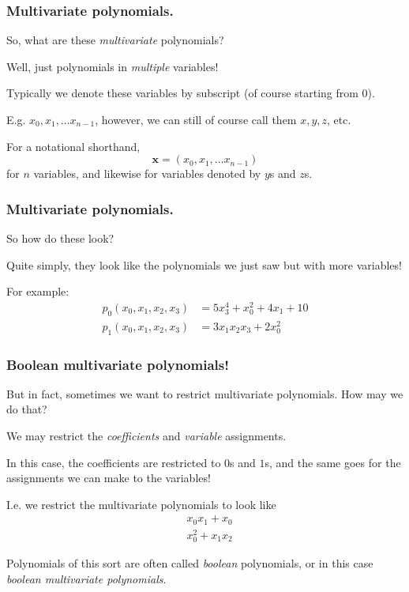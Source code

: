 \documentclass{beamer}
\begin{document}
\begin{frame}
    \frametitle{Multivariate polynomials.}
    So, what are these \textit{multivariate} polynomials?
    
    \pause 

    Well, just polynomials in \textit{multiple} variables!

    \pause 

    Typically we denote these variables by subscript (of course starting from $0$).

    E.g. $x_0, x_1, \dots x_{n - 1}$, however, we can still of course call them $x, y, z$, etc.

    \pause 

    For a notational shorthand, 
    $$
        \mathbf{x} = (x_0, x_1, \dots x_{n - 1})
    $$ 
    for $n$ variables, and likewise for variables denoted by $y$s and $z$s.
\end{frame}

\begin{frame}
    \frametitle{Multivariate polynomials.}
    So how do these look?

    \pause 

    Quite simply, they look like the polynomials we just saw but with more variables!

    \pause 
    For example:
    \begin{equation*}
        \begin{split}
            p_0(x_0, x_1, x_2, x_3) &= 5x_3^4 + x_0^2 + 4x_1 + 10\\
            p_1(x_0, x_1, x_2, x_3) &= 3x_1x_2x_3 + 2x_0^2
        \end{split}
    \end{equation*}
\end{frame}

\begin{frame}
    \frametitle{Boolean multivariate polynomials!}
    But in fact, sometimes we want to restrict multivariate polynomials. How may we do that?

    We may restrict the \textit{coefficients} and \textit{variable} assignments.
    
    In this case, the coefficients are restricted to $0$s and $1$s, and the same goes for the assignments we can make to the variables!

    \pause 

    I.e. we restrict the multivariate polynomials to look like 
    \begin{equation*}
        \begin{split}
            &x_0x_1 + x_0\\
            &x_0^2 + x_1x_2
        \end{split}
    \end{equation*}

    Polynomials of this sort are often called \textit{boolean} polynomials, or in this case \textit{boolean multivariate polynomials}.
\end{frame}
\end{document}
